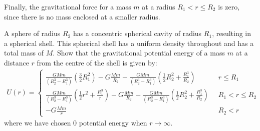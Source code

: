 \begin{solution}
Finally, the gravitational force for a mass $m$ at a radius $R_1<r\leq R_2$ is zero, since there is no mass enclosed at a smaller radius.

\end{solution}
\question  A sphere of radius $R_2$ has a concentric spherical cavity of radius $R_1$, resulting in a spherical shell. This spherical shell has a uniform density throughout and has a total mass of $M$. Show that the gravitational potential energy of a mass $m$ at a distance $r$ from the centre of the shell is given by:
\begin{align*}
U(r) = \begin{cases}
\frac{GMm}{(R_2^3-R_1^3)} \left(  \frac{3}{2}R_1^2 \right) -G\frac{Mm}{R_2}-\frac{GMm}{(R_2^3-R_1^3)} \left(  \frac{1}{2}R_2^2+\frac{R_1^3}{R_2}  \right) &\;\; r \leq R_1\\
\frac{GMm}{(R_2^3-R_1^3)} \left(  \frac{1}{2}r^2+\frac{R_1^3}{r}  \right) -G\frac{Mm}{R_2}-\frac{GMm}{(R_2^3-R_1^3)} \left(  \frac{1}{2}R_2^2+\frac{R_1^3}{R_2}  \right)  &\;\; R_1<r\leq R_2\\
-G\frac{Mm}{r} &\;\; R_2<r
\end{cases}
\end{align*}
where we have chosen 0 potential energy when $r\to\infty$.
